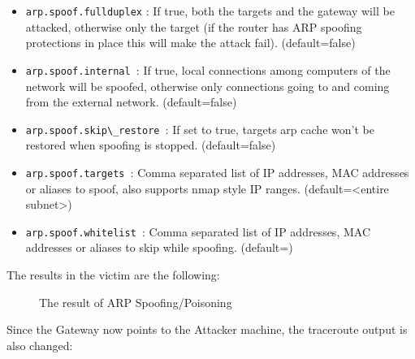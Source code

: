 \begin{itemize}
 \item  \verb|arp.spoof.fullduplex| : If true, both the targets and the gateway will be attacked, otherwise only the target (if the router has ARP spoofing protections in place this will make the attack fail). (default=false)
 \item     \verb|arp.spoof.internal |: If true, local connections among computers of the network will be spoofed, otherwise only connections going to and coming from the external network. (default=false)
 \item \verb|arp.spoof.skip\_restore |: If set to true, targets arp cache won't be restored when spoofing is stopped. (default=false)
 \item      \verb|arp.spoof.targets |: Comma separated list of IP addresses, MAC addresses or aliases to spoof, also supports nmap style IP ranges. (default=<entire subnet>)
 \item    \verb|arp.spoof.whitelist |: Comma separated list of IP addresses, MAC addresses or aliases to skip while spoofing. (default=)
\end{itemize}

The results in the victim are the following:

\begin{figure}[!hb]
\centering
 \vspace{0.5cm}
 \caption{The result of ARP Spoofing/Poisoning}\label{fig: spoof-before-after}
\end{figure}

\newpage

Since the Gateway now points to the Attacker machine, the traceroute output is also changed:

\begin{figure}[!hb]
 \centering
 \vspace{0.5cm}
\end{figure}


